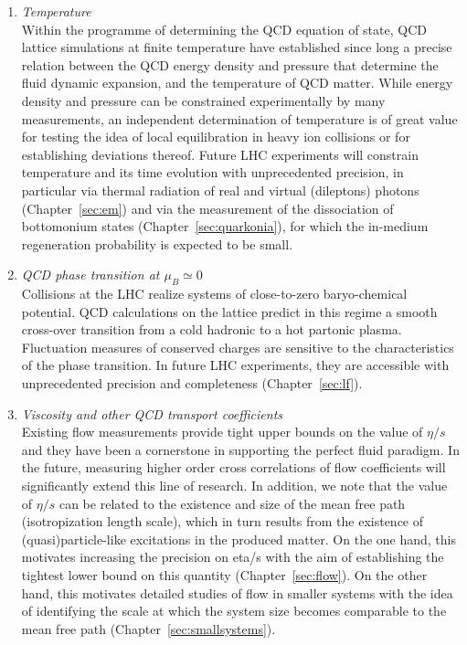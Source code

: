 \documentclass[../report.tex]{subfiles}
\begin{document}
\begin{enumerate}
\item {\it Temperature}\\
Within the programme of determining the QCD equation of state, QCD lattice simulations at finite temperature have established since long a precise relation between the QCD energy density and pressure that determine the fluid dynamic expansion, and the temperature of QCD matter.  While energy density and pressure can be constrained experimentally by many measurements, an independent determination of temperature is of great value for testing the idea of local equilibration in heavy ion collisions or for establishing deviations thereof. Future LHC experiments will constrain  temperature and its time evolution with unprecedented precision, in particular via thermal radiation of real and virtual (dileptons) photons (Chapter~\ref{sec:em}) and via the measurement of the dissociation of bottomonium states (Chapter~\ref{sec:quarkonia}), for which the in-medium regeneration probability is expected to be small.  
\item {\it QCD phase transition at $\mu_B \simeq 0$}\\ Collisions at the LHC realize systems of close-to-zero baryo-chemical potential. QCD calculations on the lattice predict in this regime a smooth cross-over transition from a cold hadronic to a hot partonic plasma. Fluctuation measures of conserved charges are sensitive to the characteristics of the phase transition. In future LHC experiments, they are accessible with unprecedented precision and completeness (Chapter~\ref{sec:lf}). 
\item {\it Viscosity and other QCD transport coefficients}\\ Existing flow measurements provide tight upper bounds on the value of $\eta/s$ and they have been a cornerstone in supporting the perfect fluid paradigm. In the future, measuring higher order cross correlations of flow coefficients will significantly extend this line of research.  In addition, we note that the value of $\eta/s$ can be related to the existence and size of the mean free path (isotropization length scale), which in turn results from the existence of (quasi)particle-like excitations in the produced matter. On the one hand, this motivates increasing the precision on eta/s with the aim of establishing the tightest lower bound on this quantity (Chapter~\ref{sec:flow}). On the other hand, this motivates detailed studies of flow in smaller systems with the idea of identifying the scale at which the system size becomes comparable to the mean free path (Chapter~\ref{sec:smallsystems}). 

\end{enumerate}
\end{document}
